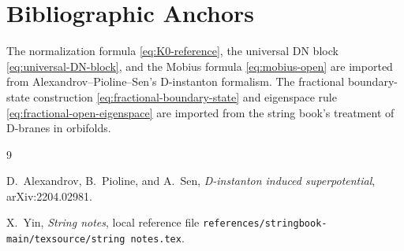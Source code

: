 \documentclass[11pt]{article}
\begin{document}
\section{Bibliographic Anchors}


The normalization formula \eqref{eq:K0-reference}, the universal DN block
\eqref{eq:universal-DN-block}, and the Mobius formula \eqref{eq:mobius-open} are imported
from Alexandrov--Pioline--Sen's D-instanton formalism. The fractional boundary-state
construction \eqref{eq:fractional-boundary-state} and eigenspace rule
\eqref{eq:fractional-open-eigenspace} are imported from the string book's treatment of
D-branes in orbifolds.

\begin{thebibliography}{9}

D.~Alexandrov, B.~Pioline, and A.~Sen,
\emph{D-instanton induced superpotential},
arXiv:2204.02981.

X.~Yin,
\emph{String notes},
local reference file \texttt{references/stringbook-main/texsource/string notes.tex}.

\end{thebibliography}
\end{document}
